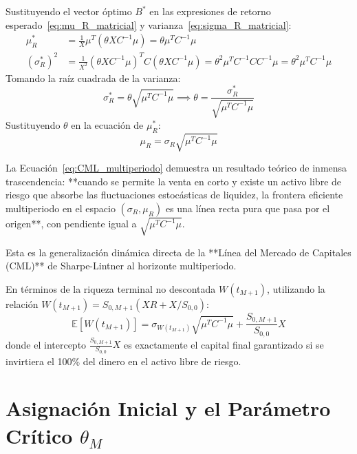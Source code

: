 \documentclass[11pt,a4paper]{report}
\numberwithin{equation}{chapter}
\begin{document}
Sustituyendo el vector óptimo $B^*$ en las expresiones de retorno esperado~\eqref{eq:mu_R_matricial} y varianza~\eqref{eq:sigma_R_matricial}:
\begin{align}
    \mu_R^* &= \frac{1}{X} \mu^T \left( \theta X C^{-1} \mu \right) = \theta \mu^T C^{-1} \mu \\
    (\sigma_R^*)^2 &= \frac{1}{X^2} \left( \theta X C^{-1} \mu \right)^T C \left( \theta X C^{-1} \mu \right) = \theta^2 \mu^T C^{-1} C C^{-1} \mu = \theta^2 \mu^T C^{-1} \mu
\end{align}
Tomando la raíz cuadrada de la varianza:
\begin{equation}
    \sigma_R^* = \theta \sqrt{\mu^T C^{-1} \mu} \implies \theta = \frac{\sigma_R^*}{\sqrt{\mu^T C^{-1} \mu}}
\end{equation}
Sustituyendo $\theta$ en la ecuación de $\mu_R^*$:
\begin{equation}
    \boxed{\mu_R = \sigma_R \sqrt{\mu^T C^{-1} \mu}} \label{eq:CML_multiperiodo}
\end{equation}

\begin{conceptbox}
La Ecuación~\eqref{eq:CML_multiperiodo} demuestra un resultado teórico de inmensa trascendencia: **cuando se permite la venta en corto y existe un activo libre de riesgo que absorbe las fluctuaciones estocásticas de liquidez, la frontera eficiente multiperiodo en el espacio $(\sigma_R, \mu_R)$ es una línea recta pura que pasa por el origen**, con pendiente igual a $\sqrt{\mu^T C^{-1} \mu}$.

Esta es la generalización dinámica directa de la **Línea del Mercado de Capitales (CML)** de Sharpe-Lintner al horizonte multiperiodo.

En términos de la riqueza terminal no descontada $W(t_{M+1})$, utilizando la relación $W(t_{M+1}) = S_{0,M+1}(X R + X/S_{0,0})$:
\begin{equation}
    \boxed{\mathbb{E}[W(t_{M+1})] = \sigma_{W(t_{M+1})} \sqrt{\mu^T C^{-1} \mu} + \frac{S_{0,M+1}}{S_{0,0}} X}
\end{equation}
donde el intercepto $\frac{S_{0,M+1}}{S_{0,0}} X$ es exactamente el capital final garantizado si se invirtiera el 100\% del dinero en el activo libre de riesgo.
\end{conceptbox}

\section{Asignación Inicial y el Parámetro Crítico $\theta_M$}
\end{document}
